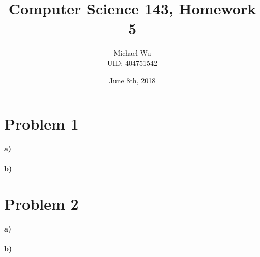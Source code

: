 \documentclass[12pt]{article}
\begin{document}
\title{Computer Science 143, Homework 5}
\date{June 8th, 2018}
\author{Michael Wu\\UID: 404751542}
\maketitle

\section*{Problem 1}

\paragraph{a)}

\paragraph{b)}

\section*{Problem 2}

\paragraph{a)}

\paragraph{b)}
\end{document}
